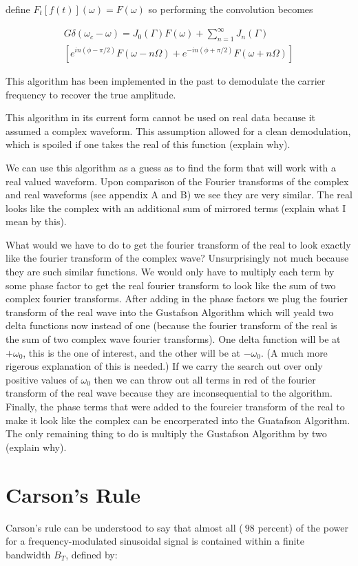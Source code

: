 \documentclass[twocolumn, groupedaddress]{revtex4-1}
\begin{document}
define $F_t[f(t)](\omega) = F(\omega)$ so performing the convolution becomes

\begin{align}
G \delta (\omega_c - \omega) = J_0(\Gamma) F(\omega) + \sum_{n=1}^{\infty} J_n(\Gamma) 	\nonumber
\\ \left[ e^{in(\phi - \pi/2)} F (\omega - n\Omega) + e^{-in(\phi + \pi/2)} F (\omega + n\Omega) \right]
\end{align}

This algorithm has been implemented in the past to demodulate the carrier frequency to recover the true amplitude.  

This algorithm in its current form cannot be used on real data because it assumed a complex waveform.  This assumption allowed for a clean demodulation, which is spoiled if one takes the real of this function (explain why).

We can use this algorithm as a guess as to find the form that will work with a real valued waveform.  Upon comparison of the Fourier transforms of the complex and real waveforms (see appendix A and B) we see they are very similar.  The real looks like the complex with an additional sum of mirrored terms (explain what I mean by this).

What would we have to do to get the fourier transform of the real to look exactly like the fourier transform of the complex wave?  Unsurprisingly not much because they are such similar functions.  We would only have to multiply each term by some phase factor to get the real fourier transform to look like the sum of two complex fourier transforms.  After adding in the phase factors we plug the  fourier transform of the real wave into the Gustafson Algorithm which will yeald two delta functions now instead of one (because the fourier transform of the real is the sum of two complex wave fourier transforms).  One delta function will be at $+\omega_0$, this is the one of interest, and the other will be at $-\omega_0$.  (A much more rigerous explanation of this is needed.)  If we carry the search out over only positive values of $\omega_0$ then we can throw out all terms in red of the fourier transform of the real wave because they are inconsequential to the algorithm.  Finally, the phase terms that were added to the foureier transform of the real to make it look like the complex can be encorperated into the Guatafson Algorithm.  The only remaining thing to do is multiply the Gustafson Algorithm by two (explain why).


\section{Carson's Rule}
Carson's rule can be understood to say that almost all ($~98$ percent) of the power for a frequency-modulated sinusoidal signal is contained within a finite bandwidth $B_T$,  defined by:
\end{document}
